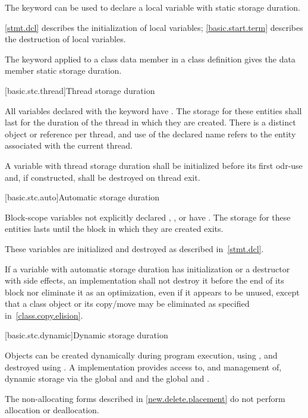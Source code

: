 \pnum
{}%
The keyword  can be used to declare a local variable with
static storage duration.
\begin{note}
\ref{stmt.dcl} describes the
initialization of local  variables; \ref{basic.start.term}
describes the destruction of local  variables.
\end{note}

\pnum
{}%
The keyword  applied to a class data member in a class
definition gives the data member static storage duration.

[basic.stc.thread]{Thread storage duration}

\pnum
All variables declared with the  keyword have
.
The storage for these entities shall last for the duration of
the thread in which they are created. There is a distinct object or reference
per thread, and use of the declared name refers to the entity associated with
the current thread.

\pnum
A variable with thread storage duration shall be initialized before
its first odr-use and, if constructed, shall be destroyed on thread exit.

[basic.stc.auto]{Automatic storage duration}

\pnum
{}%
Block-scope variables
not explicitly declared , , or  have
. The storage
for these entities lasts until the block in which they are created exits.

\pnum
\begin{note}
These variables are initialized and destroyed as described in~\ref{stmt.dcl}.
\end{note}

\pnum
If a variable with automatic storage duration has initialization or a destructor with side
effects, an implementation shall not destroy it before the end of its block
nor eliminate it as an optimization, even if it appears to be
unused, except that a class object or its copy/move may be eliminated as
specified in~\ref{class.copy.elision}.

[basic.stc.dynamic]{Dynamic storage duration}%

\pnum
Objects can be created dynamically during program
execution, using
%
, and destroyed using
%
. A \Cpp{} implementation
provides access to, and management of, dynamic storage via the global
  and  and the global   and .
\begin{note}
The non-allocating forms described in \ref{new.delete.placement}
do not perform allocation or deallocation.
\end{note}


